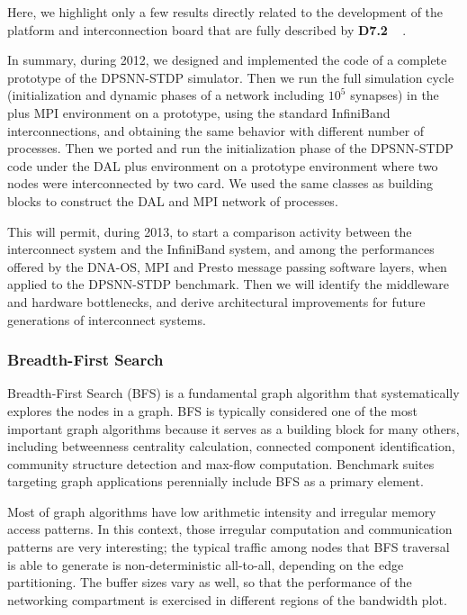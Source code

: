 Here, we highlight only a few results directly related to the
development of the \quong platform and \apenetp interconnection board
that are fully described by \textbf{D7.2} ~\cite{euretile:D7_2} .

In summary, during 2012, we designed and implemented the \cpp code of a
complete prototype of the DPSNN-STDP simulator. Then we run the full
simulation cycle (initialization and dynamic phases of a network
including $10^{5}$ synapses) in the \cpp plus MPI environment on a
\quong prototype, using the standard InfiniBand interconnections, and
obtaining the same behavior with different number of processes. Then
we ported and run the initialization phase of the DPSNN-STDP code
under the DAL plus \cpp environment on a prototype environment where
two \quong nodes were interconnected by two \apenetp card. We used the
same \cpp classes as building blocks to construct the DAL and MPI
network of processes.

This will permit, during 2013, to start a comparison activity between
the \apenetp interconnect system and the InfiniBand system, and among
the performances offered by the DNA-OS, MPI and Presto message passing
software layers, when applied to the DPSNN-STDP benchmark. Then we
will identify the middleware and hardware bottlenecks, and derive
architectural improvements for future generations of interconnect
systems.

\subsubsection{Breadth-First Search}
Breadth-First Search (BFS) is a fundamental graph algorithm that
systematically explores the nodes in a graph.
BFS is typically considered one of the most important graph algorithms
because it serves as a building block for many others, including
betweenness centrality calculation, connected component
identification, community structure detection and max-flow
computation.
Benchmark suites targeting graph applications perennially include BFS
as a primary element.

Most of graph algorithms have low arithmetic intensity and irregular
memory access patterns.
In this context, those irregular computation and communication
patterns are very interesting; the typical traffic among nodes that
BFS traversal is able to generate is non-deterministic all-to-all,
depending on the edge partitioning.
The buffer sizes vary as well, so that the performance of the
networking compartment is exercised in different regions of the
bandwidth plot.


